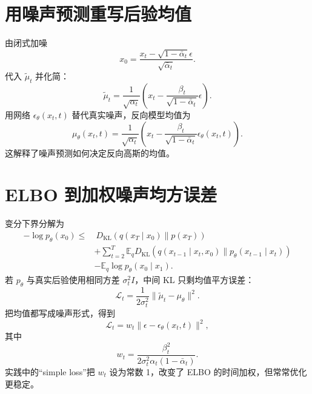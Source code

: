 \documentclass[UTF8,12pt,a4paper,fontset=none]{ctexart}
\numberwithin{equation}{section}
\newcommand{\E}{\mathbb{E}}
\newcommand{\Loss}{\mathcal{L}}
\newcommand{\KL}{D_{\mathrm{KL}}}
\begin{document}
\section{用噪声预测重写后验均值}
由闭式加噪
\begin{equation}
 x_0=\frac{x_t-\sqrt{1-\bar\alpha_t}\epsilon}
 {\sqrt{\bar\alpha_t}}.
\end{equation}
代入 $\widetilde\mu_t$ 并化简：
\begin{equation}
 \widetilde\mu_t
 =\frac1{\sqrt{\alpha_t}}
 \left(x_t-\frac{\beta_t}{\sqrt{1-\bar\alpha_t}}\epsilon\right).
\end{equation}
用网络 $\epsilon_\theta(x_t,t)$ 替代真实噪声，反向模型均值为
\begin{equation}
 \mu_\theta(x_t,t)=\frac1{\sqrt{\alpha_t}}
 \left(x_t-\frac{\beta_t}{\sqrt{1-\bar\alpha_t}}
 \epsilon_\theta(x_t,t)\right).
\end{equation}
这解释了噪声预测如何决定反向高斯的均值。

\section{ELBO 到加权噪声均方误差}
变分下界分解为
\begin{align}
 -\log p_\theta(x_0)
 \le&\ \KL(q(x_T\mid x_0)\|p(x_T))\\
 &+\sum_{t=2}^{T}
 \E_q\KL(q(x_{t-1}\mid x_t,x_0)\|p_\theta(x_{t-1}\mid x_t))\\
 &-\E_q\log p_\theta(x_0\mid x_1).
\end{align}
若 $p_\theta$ 与真实后验使用相同方差 $\sigma_t^2I$，中间 KL 只剩均值平方误差：
\begin{equation}
 \Loss_t=\frac1{2\sigma_t^2}
 \|\widetilde\mu_t-\mu_\theta\|^2.
\end{equation}
把均值都写成噪声形式，得到
\begin{equation}
 \Loss_t=w_t\|\epsilon-\epsilon_\theta(x_t,t)\|^2,
\end{equation}
其中
\begin{equation}
 w_t=\frac{\beta_t^2}
 {2\sigma_t^2\alpha_t(1-\bar\alpha_t)}.
\end{equation}
实践中的“simple loss”把 $w_t$ 设为常数 1，改变了 ELBO 的时间加权，但常常优化更稳定。
\end{document}
